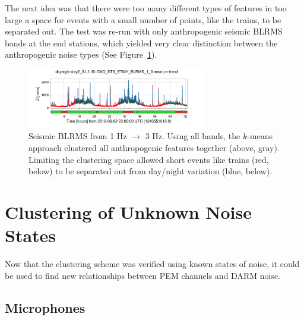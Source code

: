 \documentclass[colorlinks=true,pdfstartview=FitV,linkcolor=blue,
            citecolor=red,urlcolor=magenta]{ligodoc}
\begin{document}
The next idea was that there were too many different types of features in too large a space for events with a small number of points, like the trains, to be separated out.
The test was re-run with only anthropogenic seismic BLRMS bands at the end stations, which yielded very clear distinction between the anthropogenic noise types (See Figure~\ref{fig:trains}).

\begin{figure}
  \includegraphics[width=0.7\textwidth]{assets/final/daynight-day2_3-L1:ISI-GND_STS_ETMY_BLRMS_1_3mean,m-trend.png}
  
  \caption{Seismic BLRMS from 1 Hz $\to$ 3 Hz. Using all bands, the $k$-means approach clustered all anthropogenic features together (above, gray). Limiting the clustering space allowed short events like trains (red, below) to be separated out from day/night variation (blue, below).}\label{fig:trains}
\end{figure}

\section{Clustering of Unknown Noise States}\label{sec:unknown}
Now that the clustering scheme was verified using known states of noise, it could be used to find new relationships between PEM channels and DARM noise.

\subsection{Microphones}\label{ssec:mic}
\end{document}
